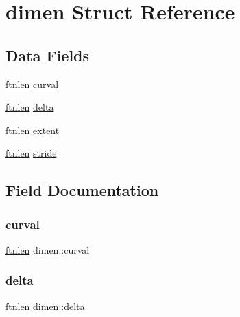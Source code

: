 \hypertarget{structdimen}{}\section{dimen Struct Reference}
\label{structdimen}
\subsection*{Data Fields}
\begin{DoxyCompactItemize}
\item 
\hyperlink{dependencies_2third-party_2clapack_23_82_81_2_f2_c_l_i_b_s_2libf2c_2f2c_8h_a2ad57b5f7f73e0131623aa6dbff6d3f3}{ftnlen} \hyperlink{structdimen_a8ee599728d928642dcb2265f6e8f5605}{curval}
\item 
\hyperlink{dependencies_2third-party_2clapack_23_82_81_2_f2_c_l_i_b_s_2libf2c_2f2c_8h_a2ad57b5f7f73e0131623aa6dbff6d3f3}{ftnlen} \hyperlink{structdimen_abf4a3fca85aecf17098129ebbb05daff}{delta}
\item 
\hyperlink{dependencies_2third-party_2clapack_23_82_81_2_f2_c_l_i_b_s_2libf2c_2f2c_8h_a2ad57b5f7f73e0131623aa6dbff6d3f3}{ftnlen} \hyperlink{structdimen_a42c8fb8a365b619472e0d5b84a06955d}{extent}
\item 
\hyperlink{dependencies_2third-party_2clapack_23_82_81_2_f2_c_l_i_b_s_2libf2c_2f2c_8h_a2ad57b5f7f73e0131623aa6dbff6d3f3}{ftnlen} \hyperlink{structdimen_aeef14482d8233afaf9f3a0f54e220357}{stride}
\end{DoxyCompactItemize}


\subsection{Field Documentation}
\mbox{\label{structdimen_a8ee599728d928642dcb2265f6e8f5605}} 
\subsubsection{\texorpdfstring{curval}{curval}}
{\footnotesize\ttfamily \hyperlink{dependencies_2third-party_2clapack_23_82_81_2_f2_c_l_i_b_s_2libf2c_2f2c_8h_a2ad57b5f7f73e0131623aa6dbff6d3f3}{ftnlen} dimen\+::curval}

\mbox{\label{structdimen_abf4a3fca85aecf17098129ebbb05daff}} 
\subsubsection{\texorpdfstring{delta}{delta}}
{\footnotesize\ttfamily \hyperlink{dependencies_2third-party_2clapack_23_82_81_2_f2_c_l_i_b_s_2libf2c_2f2c_8h_a2ad57b5f7f73e0131623aa6dbff6d3f3}{ftnlen} dimen\+::delta}

